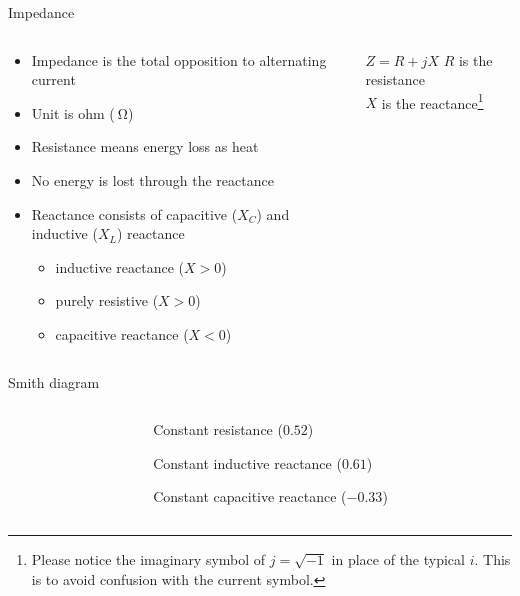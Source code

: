 \documentclass{beamer}
\begin{document}
\begin{frame}[label=impedance]{Impedance}
\begin{columns}
  \begin{column}{0.58\textwidth}
   \begin{itemize}
    \item Impedance is the total opposition to alternating current
    \item Unit is ohm ($\SI{}{\ohm}$)
    \item Resistance means energy loss as heat
    \item No energy is lost through the reactance
    \item Reactance consists of capacitive ($X_C$) and inductive ($X_L$) reactance
     \begin{itemize}
      \item inductive reactance ($X > 0$)
      \item purely resistive ($X > 0$)
      \item capacitive reactance ($X < 0$)
     \end{itemize}
   \end{itemize}
  \end{column}
  \begin{column}{0.38\textwidth}
    \begin{block}{$Z = R + jX$}
        $R$ is the resistance \\
        $X$ is the reactance\footnote{Please notice the imaginary symbol of $j = \sqrt{-1}$ in place of the typical $i$. This is to avoid confusion with the current symbol.}
    \end{block}
  \end{column}
\end{columns}
\end{frame}

\begin{frame}{Smith diagram}
\begin{columns}
 \begin{column}{0.58\textwidth}
 \end{column}
 \begin{column}{0.5\textwidth}\small
 {\color{green}Constant resistance ($0.52$)}

 {\color{blue}Constant inductive reactance ($0.61$)}

 {\color{red}Constant capacitive reactance ($-0.33$)}
 \end{column}
\end{columns}
\end{frame}
\end{document}
